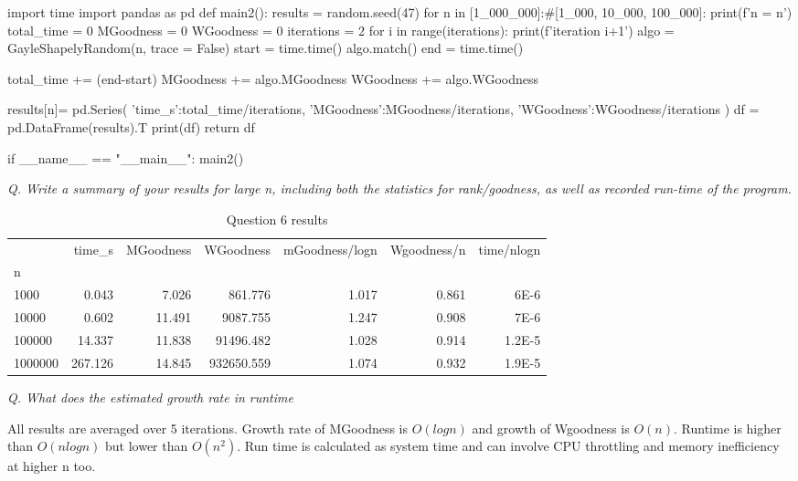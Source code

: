 \documentclass{homeworg}
\begin{document}
\begin{python}
import time
import pandas as pd
def main2():
    results = {}
    random.seed(47)
    for n in [1_000_000]:#[1_000, 10_000, 100_000]:
        print(f'n =  {n}')
        total_time = 0
        MGoodness = 0
        WGoodness = 0
        iterations = 2
        for i in range(iterations):
            print(f'iteration {i+1}')
            algo = GayleShapelyRandom(n, trace = False)
            start = time.time()
            algo.match()
            end = time.time()
            
            total_time += (end-start)
            MGoodness += algo.MGoodness
            WGoodness += algo.WGoodness
        
        results[n]= pd.Series({
                'time_s':total_time/iterations,
                'MGoodness':MGoodness/iterations,
                'WGoodness':WGoodness/iterations
            })
    df =  pd.DataFrame(results).T
    print(df)
    return df

if __name__ == "__main__":
    main2()
\end{python}

\emph{Q. Write a summary of your results for large n, including both the statistics for rank/goodness, as well as recorded run-time of the program.}

\begin{table}[h]
\centering
\caption{Question 6 results}
\label{table:q6}
\small\addtolength{\tabcolsep}{-1pt}
\begin{tabular}{lrrrrrr}
\toprule
{} &      time\_s &  MGoodness &      WGoodness &  mGoodness/logn &  Wgoodness/n &  time/nlogn \\
n       &             &            &                &                 &              &             \\
\midrule
1000    &    0.043 &   7.026 &     861.776 &        1.017 &     0.861 &    6E-6 \\
10000   &    0.602 &  11.491 &    9087.755 &        1.247 &     0.908 &    7E-6 \\
100000  &   14.337 &  11.838 &   91496.482 &        1.028 &     0.914 &    1.2E-5 \\
1000000 &  267.126 &  14.845 &  932650.559 &        1.074 &     0.932 &    1.9E-5 \\
\bottomrule
\end{tabular}
\end{table}

\emph{Q. What does the estimated growth rate in runtime}

All results are averaged over 5 iterations. Growth rate of MGoodness is $O(logn)$ and growth of Wgoodness is $O(n)$. Runtime is higher than  $O(nlogn)$ but lower than $O(n^2)$. Run time is calculated as system time and can involve CPU throttling and memory inefficiency at higher n too.
\end{document}
